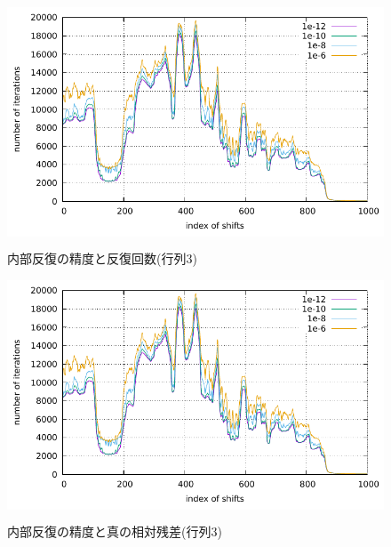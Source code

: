 \begin{figure}[H]
	\begin{center}
		\begin{minipage}[t]{0.49\columnwidth}
			\centering
			\colorbox{white}{ \includegraphics[scale=1.5, page=1]{./fig/compare-inner_VCNT10800h.pdf} }
			\caption{内部反復の精度と反復回数(行列3)}
			\label{fig-compare-inner-itr}
		\end{minipage}
		\begin{minipage}[t]{0.49\columnwidth}
			\centering
			\colorbox{white}{ \includegraphics[scale=1.5, page=2]{./fig/compare-inner_VCNT10800h.pdf} }
			\caption{内部反復の精度と真の相対残差(行列3)}
			\label{fig-compare-inner-res}
		\end{minipage}
	\end{center}
\end{figure}
\vspace{2.4pt}
